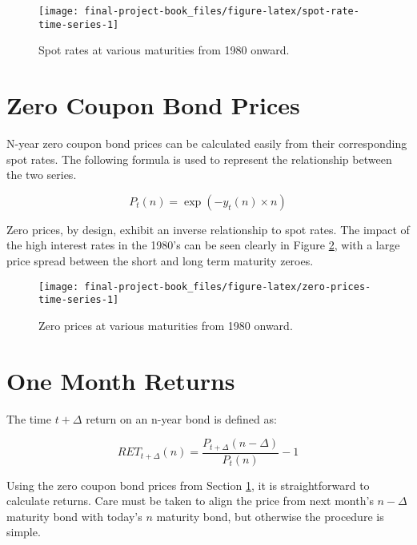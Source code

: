 \documentclass[openany]{book}
\theoremstyle{definition}
\theoremstyle{definition}
\theoremstyle{definition}
\theoremstyle{remark}
\begin{document}
\small

\begin{figure}[H]

{\centering \texttt{[image: final-project-book\_files/figure-latex/spot-rate-time-series-1]} 

}

\caption{Spot rates at various maturities from 1980 onward.}\label{fig:spot-rate-time-series}
\end{figure}

\normalsize

\hypertarget{zero-prices}{%
\section{Zero Coupon Bond Prices}\label{zero-prices}}

N-year zero coupon bond prices can be calculated easily from their
corresponding spot rates. The following formula is used to represent the
relationship between the two series.

\[ P_t(n) = \exp(-y_t(n) \times n) \]

Zero prices, by design, exhibit an inverse relationship to spot rates.
The impact of the high interest rates in the 1980's can be seen clearly
in Figure \ref{fig:zero-prices-time-series}, with a large price spread
between the short and long term maturity zeroes.

\small

\begin{figure}[H]

{\centering \texttt{[image: final-project-book\_files/figure-latex/zero-prices-time-series-1]} 

}

\caption{Zero prices at various maturities from 1980 onward.}\label{fig:zero-prices-time-series}
\end{figure}

\normalsize

\hypertarget{one-month-returns}{%
\section{One Month Returns}\label{one-month-returns}}

The time \(t+\Delta\) return on an n-year bond is defined as:

\[ RET_{t+\Delta}(n) = \frac{P_{t+\Delta}(n - \Delta)}{P_t(n)} - 1 \]

Using the zero coupon bond prices from Section \ref{zero-prices}, it is
straightforward to calculate returns. Care must be taken to align the
price from next month's \(n-\Delta\) maturity bond with today's \(n\)
maturity bond, but otherwise the procedure is simple.
\end{document}
